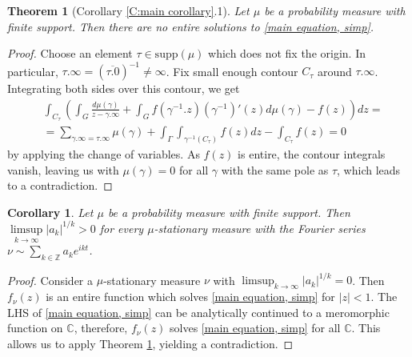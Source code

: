 \documentclass[11pt]{article}
\newtheorem{theorem}{Theorem}[section]
\newtheorem{corollary}{Corollary}[section]
\begin{document}
\begin{theorem}[Corollary \ref{C:main corollary}.1]
	\label{entire solutions}
	Let $\mu$ be a probability measure with finite support. Then there are no entire solutions to \eqref{main equation, simp}.
\end{theorem}
\begin{proof}
	Choose an element $\tau \in \text{supp}(\mu)$ which does not fix the origin. In particular, $\tau.\infty = (\overline{\tau.0})^{-1} \ne \infty$. Fix small enough contour $C_\tau$ around $\tau.\infty$. Integrating both sides over this contour, we get
	\[
	\begin{aligned}
		& \int_{C_\tau}\left( \int_G \frac{d\mu(\gamma)}{z - \gamma.\infty}  + \int_G f(\gamma^{-1}.z)(\gamma^{-1})'(z)  d\mu(\gamma) - f(z) \right) dz = \\ 
		&= \sum_{\gamma.\infty = \tau.\infty} \mu(\gamma) + \int_\Gamma \int_{\gamma^{-1}(C_\tau)} f(z) dz - \int_{C_\tau} f(z)  = 0
	\end{aligned}
	\]
	by applying the change of variables. As $f(z)$ is entire, the contour integrals vanish, leaving us with $\mu(\gamma) = 0$ for all $\gamma$ with the same pole as $\tau$, which leads to a contradiction.
\end{proof}

\begin{corollary}
	Let $\mu$ be a probability measure with finite support. Then $\limsup\limits_{k \rightarrow \infty} |a_k|^{1/k} > 0$ for every $\mu$-stationary measure with the Fourier series $\nu \sim \sum_{k \in \mathbb{Z}} a_k e^{i k t}$.
\end{corollary}
\begin{proof}
	Consider a $\mu$-stationary measure $\nu$ with $\limsup_{k \rightarrow \infty} |a_k|^{1/k} = 0$. Then $f_\nu(z)$ is an entire function which solves \eqref{main equation, simp} for $|z| < 1$. The LHS of \eqref{main equation, simp} can be analytically continued to a meromorphic function on $\mathbb{C}$, therefore, $f_\nu(z)$ solves \eqref{main equation, simp} for all $\mathbb{C}$. This allows us to apply Theorem \ref{entire solutions}, yielding a contradiction.
\end{proof}
\end{document}
